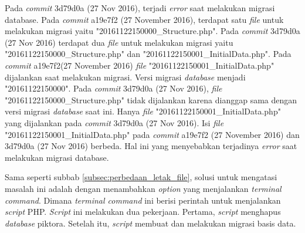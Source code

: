 Pada \textit{commit} 3d79d0a (27 Nov 2016), terjadi \textit{error} saat melakukan migrasi database. Pada \textit{commit} a19e7f2 (27 November 2016), terdapat satu \textit{file} untuk melakukan migrasi yaitu "20161122150000\_Structure.php". Pada \textit{commit} 3d79d0a (27 Nov 2016) terdapat dua \textit{file} untuk melakukan migrasi yaitu "20161122150000\_Structure.php" dan "20161122150001\_InitialData.php". Pada \textit{commit} a19e7f2(27 November 2016) \textit{file} "20161122150001\_InitialData.php" dijalankan saat melakukan migrasi. Versi migrasi \textit{database} menjadi "20161122150000". Pada \textit{commit} 3d79d0a (27 Nov 2016), \textit{file} "20161122150000\_Structure.php" tidak dijalankan karena dianggap sama dengan versi migrasi \textit{database} saat ini. Hanya \textit{file} "20161122150001\_InitialData.php" yang dijalankan pada \textit{commit} 3d79d0a (27 Nov 2016). Isi \textit{file} "20161122150001\_InitialData.php" pada \textit{commit} a19e7f2 (27 November 2016) dan 3d79d0a (27 Nov 2016) berbeda. Hal ini yang menyebabkan terjadinya \textit{error} saat melakukan migrasi database.  

Sama seperti subbab \ref{subsec:perbedaan_letak_file}, solusi untuk mengatasi masalah ini adalah dengan menambahkan \textit{option} yang menjalankan \textit{terminal command}. Dimana \textit{terminal command} ini berisi perintah untuk menjalankan \textit{script} PHP. \textit{Script} ini melakukan dua pekerjaan. Pertama, \textit{script} menghapus \textit{database} piktora. Setelah itu, \textit{script} membuat dan melakukan migrasi basis data. 
 
